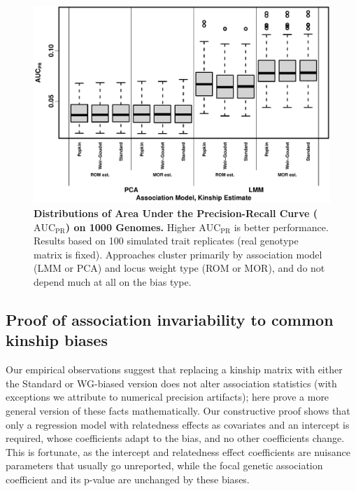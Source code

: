 \documentclass[11pt]{article}
\newcommand{\auc}{\text{AUC}_\text{PR}}
\begin{document}
\begin{figure}[bp!]
  \centering
  \includegraphics[width=\textwidth]{tgp-nygc-autosomes_ld_prune_1000kb_0.3_maf-0.01/auc.pdf}
  \caption{
    {\bf Distributions of Area Under the Precision-Recall Curve ($\auc$) on 1000 Genomes.}
    Higher $\auc$ is better performance.
    Results based on 100 simulated trait replicates (real genotype matrix is fixed).
    Approaches cluster primarily by association model (LMM or PCA) and locus weight type (ROM or MOR), and do not depend much at all on the bias type.
  }
  \label{fig:auc_real}
\end{figure}

\subsection{Proof of association invariability to common kinship biases}

Our empirical observations suggest that replacing a kinship matrix with either the Standard or WG-biased version does not alter association statistics (with exceptions we attribute to numerical precision artifacts); here prove a more general version of these facts mathematically.
Our constructive proof shows that only a regression model with relatedness effects as covariates and an intercept is required, whose coefficients adapt to the bias, and no other coefficients change.
This is fortunate, as the intercept and relatedness effect coefficients are nuisance parameters that usually go unreported, while the focal genetic association coefficient and its p-value are unchanged by these biases.
\end{document}
